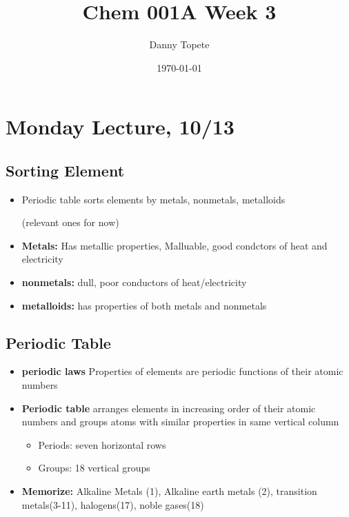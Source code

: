 \documentclass{article}
\title{Chem 001A Week 3}
\author{Danny Topete}
\date{\today}
\begin{document}
\maketitle

\section{Monday Lecture, 10/13}
\subsection{Sorting Element}
\begin{itemize}
  \item Periodic table sorts elements by metals, nonmetals, metalloids

    (relevant ones for now)
  \item \textbf{Metals:} Has metallic properties, Malluable, good condctors of heat and electricity
  \item \textbf{nonmetals:} dull, poor conductors of heat/electricity
  \item \textbf{metalloids:} has properties of both metals and nonmetals
\end{itemize}

\subsection{Periodic Table}
\begin{itemize}
  \item \textbf{periodic laws} Properties of elements are periodic functions of their atomic numbers
  \item \textbf{Periodic table} arranges elements in increasing order of their atomic numbers and groups
    atoms with similar properties in same vertical column
    \begin{itemize}
      \item Periods: seven horizontal rows
      \item Groups: 18 vertical groups
    \end{itemize}
  \item \textbf{Memorize:} Alkaline Metals (1), Alkaline earth metals (2), transition metals(3-11), halogens(17), noble gases(18)
\end{itemize}
\end{document}
